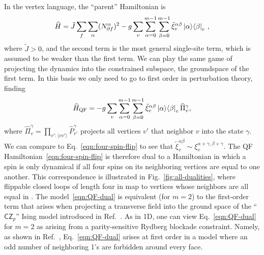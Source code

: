 In the vertex language, the ``parent'' Hamiltonian is
\begin{equation}
    \widehat{H} =  \tilde{J} \sum_f \sum_{\alpha} (N^{\alpha}_{\partial f})^2 - g \sum_v \sum_{\alpha=0}^{m-1}\sum_{\beta=0}^{m-1} \tilde{\xi}_v^{\alpha\beta} \ket{ \alpha}\!\bra{ \beta}_e
    \, , \label{eqn:dual-parent}
\end{equation}
where $\tilde{J}>0$, and the second term is the most general single-site term, which is assumed to be weaker than the first term. We can play the same game of projecting the dynamics into the constrained subspace, the groundspace of the first term. In this basis we only need to go to first order in perturbation theory, finding
%
%
\begin{equation}
    \widehat{H}_{\text{QF}} = -g \sum_v \sum_{\alpha=0}^{m-1}\sum_{\beta=0}^{m-1} \tilde{\xi}_v^{\alpha\beta} \ket{ \alpha}\!\bra{ \beta}_e \widehat{\Pi}_v^\gamma,
    \label{eqn:QF-dual}
\end{equation}
%
%
where $\hat{\Pi}_v^\gamma = \prod_{v' : \langle vv' \rangle} \hat{P}^\gamma_{v'}$ projects all vertices $v'$ that neighbor $v$ into the state $\gamma$.
We can compare to Eq.~\eqref{eqn:four-spin-flip} to see that  $\tilde{\xi}_v^{\alpha\beta} \sim \xi_v^{\alpha+\gamma, \beta+\gamma}$. The QF Hamiltonian~\eqref{eqn:four-spin-flip} is therefore dual to a Hamiltonian in which a spin is only dynamical if all four spins on its neighboring vertices are equal to one another.
This correspondence is illustrated in Fig.~\ref{fig:all-dualities}, where flippable closed loops of length four in  map to vertices whose neighbors are all equal in .
The model~\eqref{eqn:QF-dual} is equivalent (for $m=2$) to the first-order term that arises when projecting a transverse field into the ground space of the ``$\mathsf{CZ}_p$'' Ising model introduced in Ref.~\cite{Stephen2022Robust}.
As in 1D, one can view Eq.~\eqref{eqn:QF-dual} for $m=2$ as arising from a parity-sensitive Rydberg blockade constraint. Namely, as shown in Ref.~\cite{Stephen2022Robust}, Eq.~\eqref{eqn:QF-dual} arises at first order in a model where an odd number of neighboring 1's are forbidden around every face.

